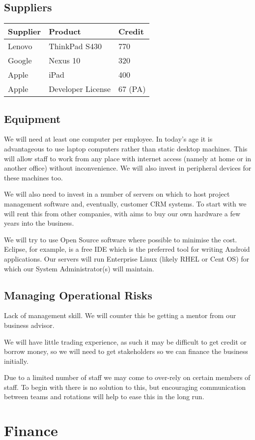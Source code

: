 \documentclass[DIV=calc, paper=a4, fontsize=11pt]{scrartcl}	 %
\begin{document}
\subsection{Suppliers}
\begin{tabular}{|l|l|l|} \hline
Supplier & Product       & Credit \\ \hline
Lenovo   & ThinkPad S430 & 770 \\ \hline
Google   & Nexus 10      & 320 \\ \hline
Apple    & iPad          & 400 \\ \hline
Apple    & Developer License & 67 (PA) \\ \hline
\end{tabular}

\subsection{Equipment}
We will need at least one computer per employee. In today's age it is advantageous to use laptop
computers rather than static desktop machines. This will allow staff to work from any place with
internet access (namely at home or in another office) without inconvenience. We will also invest
in peripheral devices for these machines too.

We will also need to invest in a number of servers on which to host project management software
and, eventually, customer CRM systems. To start with we will rent this from other companies, with
aims to buy our own hardware a few years into the business.

We will try to use Open Source software where possible to minimise the cost. Eclipse, for example,
is a free IDE which is the preferred tool for writing Android applications. Our servers will run
Enterprise Linux (likely RHEL or Cent OS) for which our System Administrator(s) will maintain. 

\subsection{Managing Operational Risks}
Lack of management skill. We will counter this be getting a mentor from our business advisor.

We will have little trading experience, as such it may be difficult to get credit or borrow money,
so we will need to get stakeholders so we can finance the business initially.

Due to a limited number of staff we may come to over-rely on certain members of staff. To begin
with there is no solution to this, but encouraging communication between teams and rotations will
help to ease this in the long run.

\section{Finance}
\end{document}
